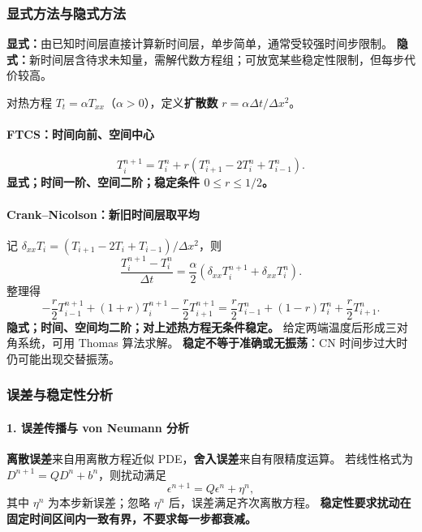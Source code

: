 \subsubsection{显式方法与隐式方法}
\textbf{显式：}由已知时间层直接计算新时间层，单步简单，通常受较强时间步限制。
\textbf{隐式：}新时间层含待求未知量，需解代数方程组；可放宽某些稳定性限制，但每步代价较高。

对热方程 $T_t=\alpha T_{xx}$（$\alpha>0$），定义\textbf{扩散数}
$r=\alpha\Delta t/\Delta x^2$。

\paragraph{FTCS：时间向前、空间中心}
\begin{equation}
 T_i^{n+1}=T_i^n+r(T_{i+1}^n-2T_i^n+T_{i-1}^n).
 \label{eq:cfd-heat-ftcs}
\end{equation}
\textbf{显式；时间一阶、空间二阶；稳定条件 $0\le r\le1/2$。}

\paragraph{Crank--Nicolson：新旧时间层取平均}
记 $\delta_{xx}T_i=(T_{i+1}-2T_i+T_{i-1})/\Delta x^2$，则
\[
 \frac{T_i^{n+1}-T_i^n}{\Delta t}
  =\frac\alpha2(\delta_{xx}T_i^{n+1}+\delta_{xx}T_i^n).
\]
整理得
\begin{equation}
 -\frac r2T_{i-1}^{n+1}+(1+r)T_i^{n+1}-\frac r2T_{i+1}^{n+1}
 =\frac r2T_{i-1}^n+(1-r)T_i^n+\frac r2T_{i+1}^n.
 \label{eq:cfd-cn}
\end{equation}
\textbf{隐式；时间、空间均二阶；对上述热方程无条件稳定。}
给定两端温度后形成三对角系统，可用 Thomas 算法求解。
\textbf{稳定不等于准确或无振荡}：CN 时间步过大时仍可能出现交替振荡。

\subsubsection{误差与稳定性分析}
\label{sec:cfd-stability}
\paragraph{1. 误差传播与 von Neumann 分析}
\textbf{离散误差}来自用离散方程近似 PDE，\textbf{舍入误差}来自有限精度运算。
若线性格式为 $D^{n+1}=QD^n+b^n$，则扰动满足
\[
 \epsilon^{n+1}=Q\epsilon^n+\eta^n,
\]
其中 $\eta^n$ 为本步新误差；忽略 $\eta^n$ 后，误差满足齐次离散方程。
\textbf{稳定性要求扰动在固定时间区间内一致有界，不要求每一步都衰减。}

